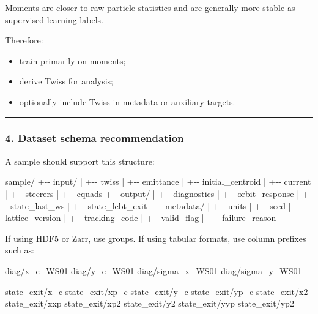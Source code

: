 \documentclass[
]{article}
\newenvironment{Shaded}{}{}
\newcommand{\NormalTok}[1]{#1}
\providecommand{\tightlist}{%
  \setlength{\itemsep}{0pt}\setlength{\parskip}{0pt}}
\begin{document}
Moments are closer to raw particle statistics and are generally more
stable as supervised-learning labels.

Therefore:

\begin{itemize}
\tightlist
\item
  train primarily on moments;
\item
  derive Twiss for analysis;
\item
  optionally include Twiss in metadata or auxiliary targets.
\end{itemize}

\begin{center}\rule{0.5\linewidth}{0.5pt}\end{center}

\hypertarget{dataset-schema-recommendation}{%
\subsubsection{4. Dataset schema
recommendation}\label{dataset-schema-recommendation}}

A sample should support this structure:

\begin{Shaded}
\begin{Highlighting}[]
\NormalTok{sample/}
\NormalTok{+{-}{-} input/}
\NormalTok{|   +{-}{-} twiss}
\NormalTok{|   +{-}{-} emittance}
\NormalTok{|   +{-}{-} initial\_centroid}
\NormalTok{|   +{-}{-} current}
\NormalTok{|   +{-}{-} steerers}
\NormalTok{|   +{-}{-} equads}
\NormalTok{+{-}{-} output/}
\NormalTok{|   +{-}{-} diagnostics}
\NormalTok{|   +{-}{-} orbit\_response}
\NormalTok{|   +{-}{-} state\_last\_ws}
\NormalTok{|   +{-}{-} state\_lebt\_exit}
\NormalTok{+{-}{-} metadata/}
\NormalTok{|   +{-}{-} units}
\NormalTok{|   +{-}{-} seed}
\NormalTok{|   +{-}{-} lattice\_version}
\NormalTok{|   +{-}{-} tracking\_code}
\NormalTok{|   +{-}{-} valid\_flag}
\NormalTok{|   +{-}{-} failure\_reason}
\end{Highlighting}
\end{Shaded}

If using HDF5 or Zarr, use groups. If using tabular formats, use column
prefixes such as:

\begin{Shaded}
\begin{Highlighting}[]
\NormalTok{diag/x\_c\_WS01}
\NormalTok{diag/y\_c\_WS01}
\NormalTok{diag/sigma\_x\_WS01}
\NormalTok{diag/sigma\_y\_WS01}

\NormalTok{state\_exit/x\_c}
\NormalTok{state\_exit/xp\_c}
\NormalTok{state\_exit/y\_c}
\NormalTok{state\_exit/yp\_c}
\NormalTok{state\_exit/x2}
\NormalTok{state\_exit/xxp}
\NormalTok{state\_exit/xp2}
\NormalTok{state\_exit/y2}
\NormalTok{state\_exit/yyp}
\NormalTok{state\_exit/yp2}
\end{Highlighting}
\end{Shaded}
\end{document}

